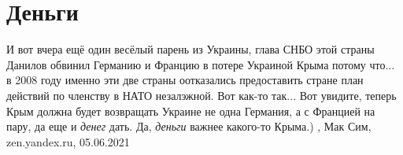  
 
 
 
 
\chapter{Деньги}

И вот вчера ещё один весёлый парень из Украины, глава СНБО этой страны Данилов
обвинил Германию и Францию в потере Украиной Крыма потому что... в 2008 году
именно эти две страны оотказались предоставить стране план действий по членству
в НАТО незалэжной.  Вот как-то так... Вот увидите, теперь Крым должна будет
возвращать Украине не одна Германия, а с Францией на пару, да еще и \emph{денег} дать.
Да, \emph{деньги} важнее какого-то Крыма.)
, 
Мак Сим, zen.yandex.ru, 05.06.2021
